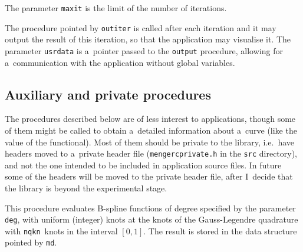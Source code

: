 The parameter \texttt{maxit} is the limit of the number of iterations.

The procedure pointed by \texttt{outiter} is called after each iteration
and it may output the result of this iteration, so that the application may
visualise it. The parameter \texttt{usrdata} is a~pointer passed to the
\texttt{output} procedure, allowing for a~communication with the application
without global variables.


\subsection{Auxiliary and private procedures}

The procedures described below are of less interest to applications, though
some of them might be called to obtain a~detailed information about a~curve
(like the value of the functional). Most of them should be private to the
library, i.e.\ have headers moved to a~private header file
(\texttt{mengercprivate.h} in the \texttt{src} directory), and not the one
intended to be included in application source files. In future some of the
headers will be moved to the private header file, after I~decide that the
library is beyond the experimental stage.

\vspace{\medskipamount}

This procedure evaluates B-spline functions of degree specified by the
parameter \texttt{deg}, with uniform (integer) knots at the knots of the
Gauss-Legendre quadrature with \texttt{nqkn}~knots in the interval $[0,1]$.
The result is stored in the data structure pointed by \texttt{md}.

\vspace{\medskipamount}

